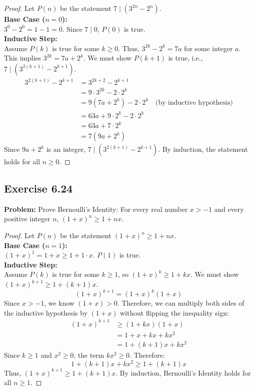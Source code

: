 \documentclass[11pt, a4paper]{article}
\theoremstyle{definition}
\theoremstyle{remark}
\begin{document}
\begin{proof}
Let $P(n)$ be the statement $7 \mid (3^{2n} - 2^n)$.
\vspace{4pt} \\
\textbf{Base Case ($n = 0$):} \\
$3^0 - 2^0 = 1 - 1 = 0$. Since $7 \mid 0$, $P(0)$ is true.
\vspace{4pt} \\
\textbf{Inductive Step:} \\
Assume $P(k)$ is true for some $k \ge 0$. Thus, $3^{2k} - 2^k = 7a$ for some integer $a$. This implies $3^{2k} = 7a + 2^k$.
We must show $P(k+1)$ is true, i.e., $7 \mid (3^{2(k+1)} - 2^{k+1})$.
\begin{align*}
3^{2(k+1)} - 2^{k+1} &= 3^{2k+2} - 2^{k+1} \\
&= 9 \cdot 3^{2k} - 2 \cdot 2^k \\
&= 9(7a + 2^k) - 2 \cdot 2^k \quad \text{(by inductive hypothesis)} \\
&= 63a + 9 \cdot 2^k - 2 \cdot 2^k \\
&= 63a + 7 \cdot 2^k \\
&= 7(9a + 2^k)
\end{align*}
Since $9a + 2^k$ is an integer, $7 \mid (3^{2(k+1)} - 2^{k+1})$. By induction, the statement holds for all $n \ge 0$.
\end{proof}

\subsection{Exercise 6.24}
\textbf{Problem:} Prove Bernoulli's Identity: For every real number $x > -1$ and every positive integer $n$, $(1+x)^n \ge 1+nx$.

\begin{proof}
Let $P(n)$ be the statement $(1+x)^n \ge 1+nx$.
\vspace{4pt} \\
\textbf{Base Case ($n = 1$):} \\
$(1+x)^1 = 1+x \ge 1+1 \cdot x$. $P(1)$ is true.
\vspace{4pt} \\
\textbf{Inductive Step:} \\
Assume $P(k)$ is true for some $k \ge 1$, so $(1+x)^k \ge 1+kx$. We must show $(1+x)^{k+1} \ge 1+(k+1)x$.
\[ (1+x)^{k+1} = (1+x)^k (1+x) \]
Since $x > -1$, we know $(1+x) > 0$. Therefore, we can multiply both sides of the inductive hypothesis by $(1+x)$ without flipping the inequality sign:
\begin{align*}
(1+x)^{k+1} &\ge (1+kx)(1+x) \\
&= 1 + x + kx + kx^2 \\
&= 1 + (k+1)x + kx^2
\end{align*}
Since $k \ge 1$ and $x^2 \ge 0$, the term $kx^2 \ge 0$. Therefore:
\[ 1 + (k+1)x + kx^2 \ge 1 + (k+1)x \]
Thus, $(1+x)^{k+1} \ge 1+(k+1)x$. By induction, Bernoulli's Identity holds for all $n \ge 1$.
\end{proof}
\end{document}
